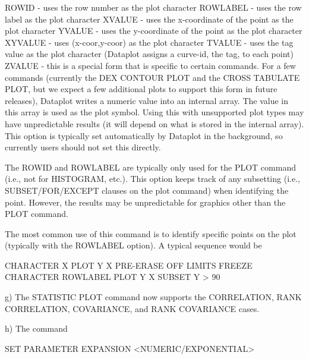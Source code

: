 {          ROWID     - uses the row number as the plot character
          ROWLABEL  - uses the row label as the plot character
          XVALUE    - uses the x-coordinate of the point as the
                      plot character
          YVALUE    - uses the y-coordinate of the point as the
                      plot character
          XYVALUE   - uses (x-coor,y-coor) as the plot character
          TVALUE    - uses the tag value as the plot character
                      (Dataplot assigns a curve-id, the tag,
                      to each point)
          ZVALUE    - this is a special form that is specific to
                      certain commands.  For a few commands (currently
                      the DEX CONTOUR PLOT and the CROSS TABULATE 
                      PLOT, but we expect a few
                      additional plots to support this form in future
                      releases), Dataplot writes a numeric value into
                      an internal array.  The value in this array is
                      used as the plot symbol.  Using this with
                      unsupported plot types may have unpredictable
                      results (it will depend on what is stored in
                      the internal array).  This option is typically
                      set automatically by Dataplot in the
                      background, so currently users should not
                      set this directly.

       The ROWID and ROWLABEL are typically only used for the
       PLOT command (i.e., not for HISTOGRAM, etc.).  This option
       keeps track of any subsetting (i.e., SUBSET/FOR/EXCEPT
       clauses on the plot command) when identifying the point.
       However, the results may be unpredictable for graphics other
       than the PLOT command.

       The most common use of this command is to identify specific
       points on the plot (typically with the ROWLABEL option).
       A typical sequence would be

         CHARACTER X
         PLOT Y X
         PRE-ERASE OFF
         LIMITS FREEZE
         CHARACTER ROWLABEL
         PLOT Y X SUBSET Y > 90
       
    g) The STATISTIC PLOT command now supports the
       CORRELATION, RANK CORRELATION, COVARIANCE, and RANK
       COVARIANCE cases.

    h) The command

          SET PARAMETER EXPANSION <NUMERIC/EXPONENTIAL>

}
